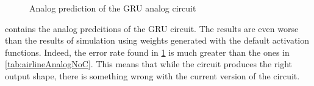 \begin{figure}[H]
  \centering
  
  \caption{Analog prediction of the \ac{GRU} analog circuit}
  \label{graph:airlineAnalogGRU}
\end{figure}

 contains the analog predcitions of the \ac{GRU} circuit. The results are even worse than the results of simulation using weights generated with the default activation functions. Indeed, the error rate found in \cref{graph:airlineAnalogGRU} is much greater than the ones in \cref{tab:airlineAnalogNoC}. This means that while the circuit produces the right output shape, there is something wrong with the current version of the circuit.
